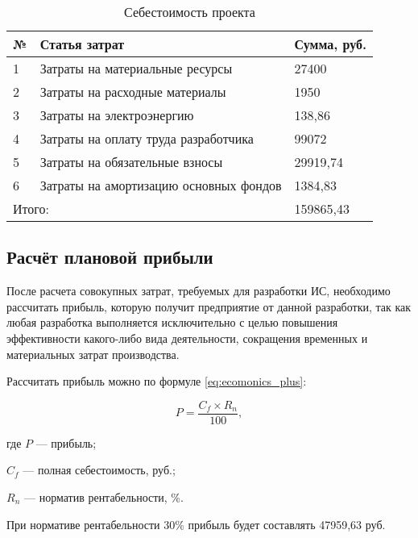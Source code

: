 \begin{footnotesize}
\begin{longtable}[h]{|p{}|p{}|p{}|}
	\caption{\label{tab:sebest}Себестоимость проекта} \\
	\hline
		\textbf{№} &
		\textbf{Статья затрат} &
		\textbf{Сумма, руб.} \\
	\hline
		1 & Затраты на материальные ресурсы & 27400 \\ \hline
		2 & Затраты на расходные материалы & 1950 \\ \hline
		3 & Затраты на электроэнергию & 138,86 \\ \hline
		4 & Затраты на оплату труда разработчика & 99072 \\ \hline
		5 & Затраты на обязательные взносы & 29919,74 \\ \hline
		6 & Затраты на амортизацию основных фондов & 1384,83 \\ \hline
		\multicolumn{2}{|l|}{Итого:} & 159865,43 \\ \hline
\end{longtable}
\end{footnotesize}

\subsection{Расчёт плановой прибыли}

После расчета совокупных затрат, требуемых для разработки ИС, необходимо рассчитать прибыль, которую получит предприятие от данной разработки, так как любая разработка выполняется исключительно с целью повышения эффективности какого-либо вида деятельности, сокращения временных и материальных затрат производства.

Рассчитать прибыль можно по формуле \ref{eq:ecomonics_plus}:

\begin{equation}
	\label{eq:ecomonics_plus}
	P = \frac{C_{f} \times R_{n}}{100},
\end{equation}
\begin{ESKDexplanation}
	\item где $P$ --- прибыль;
	\item $C_{f}$ --- полная себестоимость, руб.;
	\item $R_{n}$ --- норматив рентабельности, \%.
\end{ESKDexplanation}

При нормативе рентабельности 30\% прибыль будет составлять 47959,63 руб.

